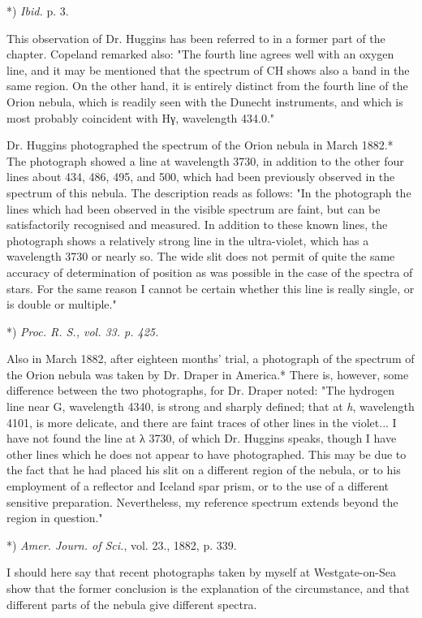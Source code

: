 \documentclass[a4paper, 12pt, oneside, polutonikogreek, english]{article}
\begin{document}
*) \emph{Ibid.} p. 3.

This observation of Dr. Huggins has been referred to in a former part of the chapter. Copeland remarked also: "The fourth line agrees well with an oxygen line, and it may be mentioned that the spectrum of CH shows also a band in the same region. On the other hand, it is entirely distinct from the fourth line of the Orion nebula, which is readily seen with the Dunecht instruments, and which is most probably coincident with Hγ, wavelength 434.0."

Dr. Huggins photographed the spectrum of the Orion nebula in March 1882.* The photograph showed a line at wavelength 3730, in addition to the other four lines about 434, 486, 495, and 500, which had been previously observed in the spectrum of this nebula. The description reads as follows: "In the photograph the lines which had been observed in the visible spectrum are faint, but can be satisfactorily recognised and measured. In addition to these known lines, the photograph shows a relatively strong line in the ultra-violet, which has a wavelength 3730 or nearly so. The wide slit does not permit of quite the same accuracy of determination of position as was possible in the case of the spectra of stars. For the same reason I cannot be certain whether this line is really single, or is double or multiple."

*) \emph{Proc. R. S., vol. 33. p. 425.}

Also in March 1882, after eighteen months' trial, a photograph of the spectrum of the Orion nebula was taken by Dr. Draper in America.* There is, however, some difference between the two photographs, for Dr. Draper noted: "The hydrogen line near G, wavelength 4340, is strong and sharply defined; that at \emph{h}, wavelength 4101, is more delicate, and there are faint traces of other lines in the violet... I have not found the line at λ 3730, of which Dr. Huggins speaks, though I have other lines which he does not appear to have photographed. This may be due to the fact that he had placed his slit on a different region of the nebula, or to his employment of a reflector and Iceland spar prism, or to the use of a different sensitive preparation. Nevertheless, my reference spectrum extends beyond the region in question."

*) \emph{Amer. Journ. of Sci.}, vol. 23., 1882, p. 339.

I should here say that recent photographs taken by myself at Westgate-on-Sea show that the former conclusion is the explanation of the circumstance, and that different parts of the nebula give different spectra.
\end{document}
